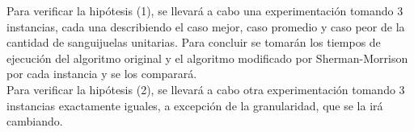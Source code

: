 Para verificar la hipótesis (1), se llevará a cabo una experimentación tomando 3 instancias, cada una describiendo el caso mejor, caso promedio y caso peor de la cantidad de sanguijuelas unitarias. Para concluir se tomarán los tiempos de ejecución del algoritmo original y el algoritmo modificado por Sherman-Morrison por cada instancia y se los comparará.\\
Para verificar la hipótesis (2), se llevará a cabo otra experimentación tomando 3 instancias exactamente iguales, a excepción de la granularidad, que se la irá cambiando.



